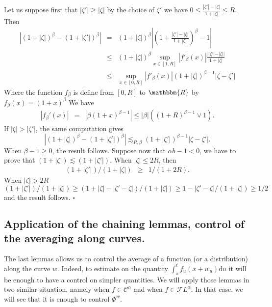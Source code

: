 \documentclass[a4paper,11pt]{article}
\newcommand{\mathd}{\mathrm{d}}
\newenvironment{proof}{{\sc Proof.}}{\hfill$\square$}
\newcommand{\CC}{\mathscr C}
\newcommand{\CF}{\mathscr F}
\begin{document}
\begin{proof}
  Let us suppose first that $| \zeta' | \geqslant | \zeta |$ by the choice of
  $\zeta'$ we have $0 \leqslant \frac{| \zeta' | - | \zeta |}{1+ | \zeta |}
  \leqslant R$. Then
  \begin{eqnarray*}
    | ( 1+ | \zeta | )^{\beta} - ( 1+ | \zeta' | )^{\beta} | & = & ( 1+ |
    \zeta | )^{\beta} \left\lvert \left( 1+ \frac{| \zeta' | - | \zeta |}{1+ |
    \zeta |} \right)^{\beta} -1 \right\lvert\\
    & \leqslant & ( 1+ | \zeta | )^{\beta} \sup_{x \in [ 1,R ]} | f'_{\beta}
    ( x ) | \frac{| | \zeta' | - | \zeta | |}{1+ | \zeta |}\\
    & \leqslant & \sup_{x \in [ 0,R ]} | f'_{\beta} ( x ) | ( 1+ | \zeta |
    )^{\beta -1} | \zeta - \zeta' |
  \end{eqnarray*}
  Where the function $f_{\beta}$ is define from $[ 0,R ]$ to $\mathbbm{R}$ by
  \ $f_{\beta} ( x ) = ( 1+x )^{\beta}$ We have
  \begin{eqnarray*}
    | f_{\beta}' ( x ) | & = & | \beta ( 1+x )^{\beta -1} | \leqslant | \beta
    | ( ( 1+R )^{\beta -1} \vee 1 ) .
  \end{eqnarray*}
  If $| \zeta | > | \zeta' |$, the same computation gives
  \[ | ( 1+ | \zeta | )^{\beta} - ( 1+ | \zeta' | )^{\beta} | \lesssim_{R,
     \beta} ( 1+ | \zeta' | )^{\beta -1} | \zeta - \zeta' | . \]
  When $\beta -1 \geqslant 0$, the result follows. Suppose now that $\alpha
  b-1<0$, we have to prove that $( 1+ | \zeta | ) \lesssim ( 1+ | \zeta' | )$.
  When $| \zeta | \leqslant 2R$, then
  \begin{eqnarray*}
    ( 1+ | \zeta' | ) / ( 1+ | \zeta | ) & \geqslant & 1/ ( 1+2R ) .
  \end{eqnarray*}
  When $| \zeta | >2R$
  \[ ( 1+ | \zeta' | ) / ( 1+ | \zeta | ) \geqslant ( 1+ | \zeta | - | \zeta'
     - \zeta |   ) / ( 1+ | \zeta | ) \geqslant 1- | \zeta' - \zeta | / ( 1+ |
     \zeta | ) \geqslant 1/2 \]
  and the result follows.
\end{proof}

\subsection{Application of the chaining lemmas, control of the averaging along
curves.}

The last lemmas allows us to control the average of a function (or a
distribution) along the curve $w$. Indeed, to estimate on the quantity
$\int_{s}^{t} f_{u} ( x+w_{u} ) \mathd u$ it will be enough to have a control
on simpler quantities. We will apply those lemmas in two similar situation,
namely when $f \in \CC^{\alpha}$ and when $f \in \CF L^{\alpha}$. In that
case, we will see that it is enough to control $\Phi^{w}$.
\end{document}

